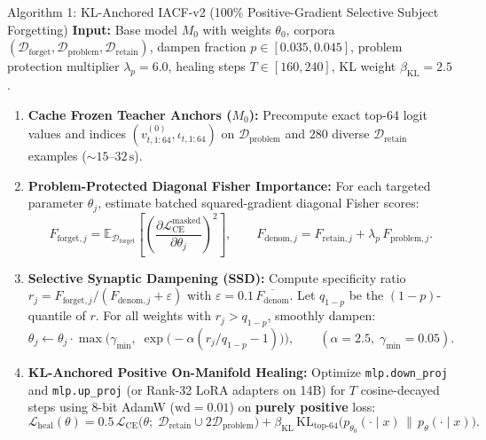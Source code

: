 \documentclass[10.5pt,letterpaper]{article}
\begin{document}
\begin{algobox}{Algorithm 1: KL-Anchored IACF-v2 (100\% Positive-Gradient Selective Subject Forgetting)}
\small
\textbf{Input:} Base model $M_0$ with weights $\theta_0$, corpora $(\mathcal{D}_{\text{forget}}, \mathcal{D}_{\text{problem}}, \mathcal{D}_{\text{retain}})$, dampen fraction $p \in [0.035, 0.045]$, problem protection multiplier $\lambda_p = 6.0$, healing steps $T \in [160, 240]$, KL weight $\beta_{\text{KL}} = 2.5$.
\begin{enumerate}[itemsep=2pt]
  \item \textbf{Cache Frozen Teacher Anchors ($M_0$):} Precompute exact top-64 logit values and indices $(v^{(0)}_{t,1:64}, \iota_{t,1:64})$ on $\mathcal{D}_{\text{problem}}$ and $280$ diverse $\mathcal{D}_{\text{retain}}$ examples ($\sim\!15\text{--}32\,\text{s}$).
  \item \textbf{Problem-Protected Diagonal Fisher Importance:} For each targeted parameter $\theta_j$, estimate batched squared-gradient diagonal Fisher scores:
  \[
    F_{\text{forget}, j} = \mathbb{E}_{\mathcal{D}_{\text{forget}}} \!\left[\left(\frac{\partial \mathcal{L}_{\text{CE}}^{\text{masked}}}{\partial \theta_j}\right)^{\!2}\right], \qquad
    F_{\text{denom}, j} = F_{\text{retain}, j} + \lambda_p\, F_{\text{problem}, j}.
  \]
  \item \textbf{Selective Synaptic Dampening (SSD):} Compute specificity ratio $r_j = F_{\text{forget}, j} / (F_{\text{denom}, j} + \varepsilon)$ with $\varepsilon = 0.1\,\overline{F_{\text{denom}}}$. Let $q_{1-p}$ be the $(1-p)$-quantile of $r$. For all weights with $r_j > q_{1-p}$, smoothly dampen:
  \[
    \theta_j \leftarrow \theta_j \cdot \max\!\Big(\gamma_{\min},\; \exp\!\big(-\alpha (r_j / q_{1-p} - 1)\big)\Big), \qquad (\alpha = 2.5,\; \gamma_{\min} = 0.05).
  \]
  \item \textbf{KL-Anchored Positive On-Manifold Healing:} Optimize \texttt{mlp.down\_proj} and \texttt{mlp.up\_proj} (or Rank-32 LoRA adapters on 14B) for $T$ cosine-decayed steps using 8-bit AdamW ($\text{wd}=0.01$) on \textbf{purely positive} loss:
  \[
    \mathcal{L}_{\text{heal}}(\theta) = 0.5\,\mathcal{L}_{\text{CE}}\big(\theta;\; \mathcal{D}_{\text{retain}} \cup 2\mathcal{D}_{\text{problem}}\big) + \beta_{\text{KL}}\,\mathrm{KL}_{\text{top-64}}\!\big(p_{\theta_0}(\cdot\mid x)\,\|\,p_{\theta}(\cdot\mid x)\big).
  \]
\end{enumerate}
\end{algobox}
\end{document}

